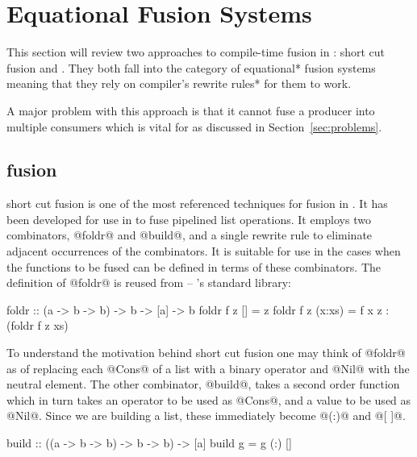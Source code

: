 \documentclass[preamble.tex]{subfiles}
\begin{document}
\chapter{Equational Fusion Systems}
\label{sec:Equational-Fusion-Systems}
\ieqf{}

This section will review two approaches to compile-time fusion in \Haskell:  short cut fusion and . They both fall into the category of \*equational* fusion systems meaning that they rely on compiler's \*rewrite rules* \cite{PTH01} for them to work.

A major problem with this approach is that it cannot fuse a producer into multiple consumers which is vital for  as discussed in Section~\ref{sec:problems}.


\clearpage

\section{ fusion}
\label{sec:foldr-build}

 short cut fusion \cite{GLP93} is one of the most referenced techniques for fusion in \Haskell. It has been developed for use in \GHC to fuse pipelined list operations. It employs two combinators, @foldr@ and @build@, and a single rewrite rule to eliminate adjacent occurrences of the combinators. It is suitable for use in the cases when the functions to be fused can be defined in terms of these combinators. The definition of @foldr@ is reused from  -- \Haskell's standard library:

\begin{hscode}
foldr :: (a -> b -> b) -> b -> [a] -> b
foldr f z []     = z
foldr f z (x:xs) = f x z : (foldr f z xs)
\end{hscode}


To understand the motivation behind short cut fusion one may think of @foldr@ as of replacing each @Cons@ of a list with a binary operator and @Nil@ with the neutral element. The other combinator, @build@, takes a second order function which in turn takes an operator to be used as @Cons@, and a value to be used as @Nil@. Since we are building a list, these immediately become @(:)@ and @[ ]@.

\begin{hscode}
build :: ((a -> b -> b) -> b -> b) -> [a]
build g = g (:) []
\end{hscode}
\end{document}
